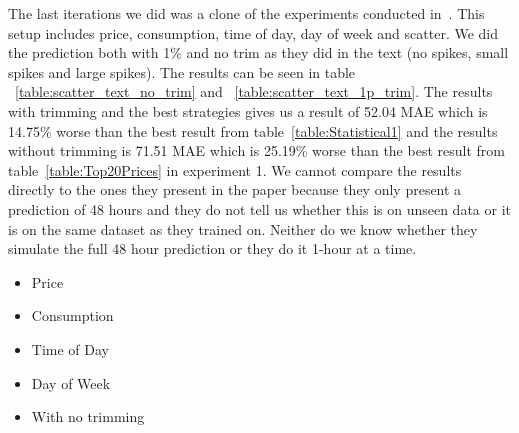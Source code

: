 The last iterations we did was a clone of the experiments conducted in~\cite{singhal2011electricity}. This setup includes price, consumption, time of day, day of week and scatter. We did the prediction both with 1\% and no trim as they did in the text (no spikes, small spikes and large spikes). The results can be seen in table ~\ref{table:scatter_text_no_trim} and ~\ref{table:scatter_text_1p_trim}. The results with trimming and the best strategies gives us a result of 52.04 MAE which is 14.75\% worse than the best result from table~\ref{table:Statistical1} and the results without trimming is 71.51 MAE which is 25.19\% worse than the best result from table~\ref{table:Top20Prices} in experiment 1. We cannot compare the results directly to the ones they present in the paper because they only present a prediction of 48 hours and they do not tell us whether this is on unseen data or it is on the same dataset as they trained on. Neither do we know whether they simulate the full 48 hour prediction or they do it 1-hour at a time.

\begin{itemize}
	\item Price
	\item Consumption
	\item Time of Day
	\item Day of Week
	\item With no trimming
\end{itemize}
\begin{table}[H]
\centering  %
\caption{Scatter text~\cite{singhal2011electricity} with other statistical features and no trim} %
\label{table:scatter_text_no_trim} %
\end{table}


